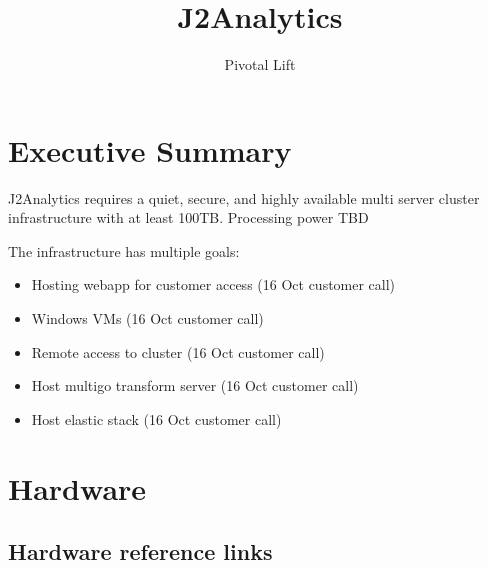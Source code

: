 \documentclass[11pt, oneside]{report}   	%
\title{J2Analytics}
\author{Pivotal Lift}
\begin{document}
\maketitle
\section{Executive Summary}
 J2Analytics requires a quiet, secure, and highly available multi server cluster infrastructure with at least 100TB.
 Processing power TBD
 
  The infrastructure has multiple goals:
 \begin{itemize}
 
   \item Hosting webapp for customer access (16 Oct customer call)
    \item Windows VMs (16 Oct customer call)
    \item Remote access to cluster (16 Oct customer call)
    \item Host multigo transform server (16 Oct customer call)
    \item Host elastic stack (16 Oct customer call)
 \end {itemize}

\section {Hardware}


\subsection{ Hardware reference links}
\end{document}

